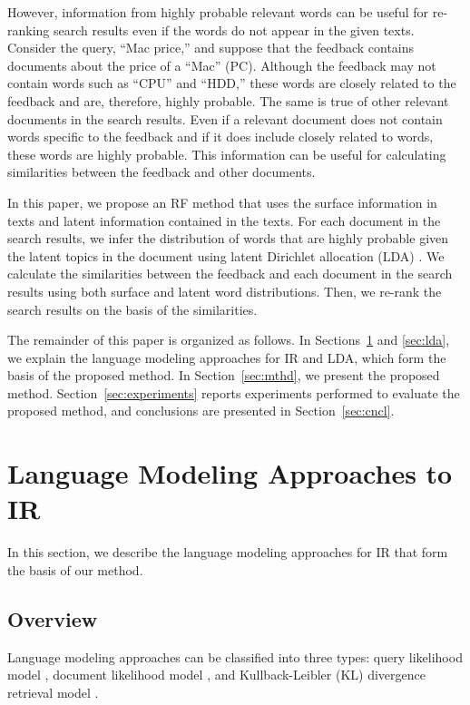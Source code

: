 \documentclass[english]{jnlp_1.4_rep}
\begin{document}
However, information from highly probable relevant words can be useful
for re-ranking search results even if the words do not appear in the
given texts. Consider the query, ``Mac price,'' and suppose that the
feedback contains documents about the price of a ``Mac'' (PC). Although
the feedback may not contain words such as ``CPU'' and ``HDD,'' these
words are closely related to the feedback and are, therefore, highly
probable. The same is true of other relevant documents in the search
results. Even if a relevant document does not contain words specific to
the feedback and if it does include closely related to words, these
words are highly probable. This information can be useful for
calculating similarities between the feedback and other documents.

In this paper, we propose an RF method that uses the surface information
in texts and latent information contained in the texts. For each
document in the search results, we infer the distribution of words that
are highly probable given the latent topics in the document using latent
Dirichlet allocation (LDA) \cite{Blei2003}. We calculate the
similarities between the feedback and each document in the search
results using both surface and latent word distributions. Then, we
re-rank the search results on the basis of the similarities.

The remainder of this paper is organized as follows. In
Sections~\ref{sec:lm_approaches} and \ref{sec:lda}, we explain the
language modeling approaches for IR and LDA, which form the basis of the
proposed method. In Section~\ref{sec:mthd}, we present the proposed
method. Section~\ref{sec:experiments} reports experiments performed to
evaluate the proposed method, and conclusions are presented in
Section~\ref{sec:cncl}.


\section{Language Modeling Approaches to IR}
\label{sec:lm_approaches}

In this section, we describe the language modeling approaches for IR
that form the basis of our method.


\subsection{Overview}

Language modeling approaches can be classified into three types: query
likelihood model \cite{Ponte1998}, document likelihood
model \cite{Lavrenko2001}, and Kullback-Leibler (KL) divergence
retrieval model \cite{Lafferty2001}.
\end{document}
